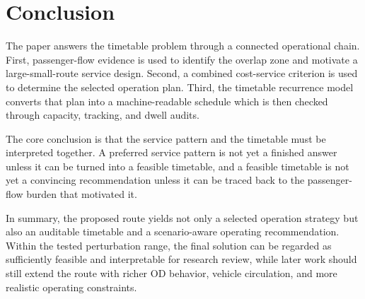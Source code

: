 \section{Conclusion}

The paper answers the timetable problem through a connected operational chain. First, passenger-flow evidence is used to identify the overlap zone and motivate a large-small-route service design. Second, a combined cost-service criterion is used to determine the selected operation plan. Third, the timetable recurrence model converts that plan into a machine-readable schedule which is then checked through capacity, tracking, and dwell audits.

The core conclusion is that the service pattern and the timetable must be interpreted together. A preferred service pattern is not yet a finished answer unless it can be turned into a feasible timetable, and a feasible timetable is not yet a convincing recommendation unless it can be traced back to the passenger-flow burden that motivated it.

In summary, the proposed route yields not only a selected operation strategy but also an auditable timetable and a scenario-aware operating recommendation. Within the tested perturbation range, the final solution can be regarded as sufficiently feasible and interpretable for research review, while later work should still extend the route with richer OD behavior, vehicle circulation, and more realistic operating constraints.

